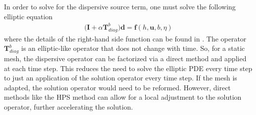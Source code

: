 In order to solve for the dispersive source term, one must solve the following elliptic equation
\begin{align}
    \big( \textbf{I} + \alpha \textbf{T}_{diag}^b \big) \textbf{d} = \textbf{f}(h, \textbf{u}, b, \eta)
\end{align}
where the details of the right-hand side function can be found in \cite{lannes2015new}. The operator $\textbf{T}_{diag}^b$ is an elliptic-like operator that does not change with time. So, for a static mesh, the dispersive operator can be factorized via a direct method and applied at each time step. This reduces the need to solve the elliptic PDE every time step to just an application of the solution operator every time step. If the mesh is adapted, the solution operator would need to be reformed. However, direct methods like the HPS method can allow for a local adjustment to the solution operator, further accelerating the solution.
